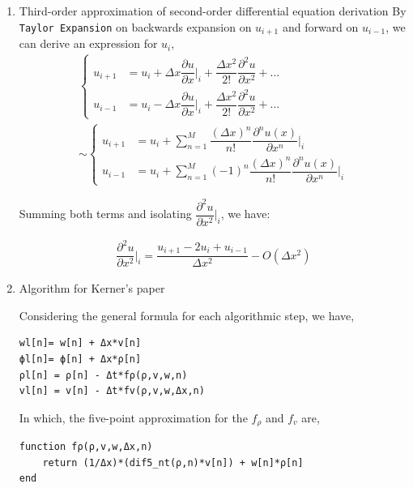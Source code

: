 \documentclass[11pt]{article}
\begin{document}
\begin{enumerate}
\item Third-order approximation of second-order differential equation derivation
\label{sec:org5785936}
By \texttt{Taylor Expansion} on backwards expansion on \(u_{i+1}\) and forward on
\(u_{i-1}\), we can derive an expression for \(u_i\),
\begin{equation}
\begin{aligned}
\begin{cases}
u_{i+1} &= u_{i} + \Delta{x}\dfrac{\partial{u}}{\partial{x}}\biggr\rvert_i + \dfrac{\Delta{x^2}}{2!}\dfrac{\partial^2{u}}{\partial{x^2}} + \ldots \\
u_{i-1} &= u_{i} - \Delta{x}\dfrac{\partial{u}}{\partial{x}}\biggr\rvert_i + \dfrac{\Delta{x^2}}{2!}\dfrac{\partial^2{u}}{\partial{x^2}} + \ldots
\end{cases}\\
\sim
\begin{cases}
u_{i+1} &= u_{i} + \sum_{n=1}^{M}{\dfrac{(\Delta{x})^n}{n!}\dfrac{\partial^n{u(x)}}{\partial{x^n}}\biggr\rvert_i}\\
u_{i-1} &= u_{i} + \sum_{n=1}^{M}{(-1)^n\dfrac{(\Delta{x})^n}{n!}\dfrac{\partial^n{u(x)}}{\partial{x^n}}\biggr\rvert_i}
\end{cases}
\end{aligned}
\end{equation}

Summing both terms and isolating
\(\dfrac{\partial^2{u}}{\partial{x^2}}\biggr\rvert_i\), we have:

\begin{equation}
\begin{aligned}
\dfrac{\partial^2{u}}{\partial{x^2}}\biggr\rvert_i = \dfrac{u_{i+1}-2u_i+u_{i-1}}{\Delta{x^2}} - O(\Delta{x^2})
\end{aligned}
\end{equation}
\item Algorithm for Kerner's paper
\label{sec:org3d2b2d2}

Considering the general formula for each algorithmic step, we have,
\begin{verbatim}
wl[n]= w[n] + Δx*v[n]
ϕl[n]= ϕ[n] + Δx*ρ[n]
ρl[n] = ρ[n] - Δt*fρ(ρ,v,w,n)
vl[n] = v[n] - Δt*fv(ρ,v,w,Δx,n)
\end{verbatim}

In which, the five-point approximation for the \(f_{\rho}\) and \(f_v\) are,

\begin{verbatim}
function fρ(ρ,v,w,Δx,n)
    return (1/Δx)*(dif5_nt(ρ,n)*v[n]) + w[n]*ρ[n]
end
\end{verbatim}


\end{enumerate}
\end{document}
